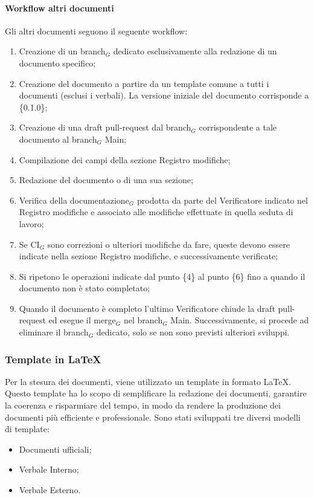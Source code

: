 \documentclass[10pt]{article}
\begin{document}
\begin{justify}
        \paragraph{Workflow altri documenti}
        Gli altri documenti seguono il seguente workflow:
        \begin{enumerate}
            \item Creazione di un branch$_G$ dedicato esclusivamente alla redazione di un documento specifico;
            \item Creazione del documento a partire da un template comune a tutti i documenti (esclusi i verbali). La versione iniziale del documento corrisponde a \{0.1.0\};
            \item Creazione di una draft pull-request dal branch$_G$ corrispondente a tale documento al branch$_G$ Main;
            \item Compilazione dei campi della sezione Registro modifiche;
            \item Redazione del documento o di una sua sezione;
            \item Verifica della documentazione$_G$ prodotta da parte del Verificatore indicato nel Registro modifiche e associato alle modifiche effettuate in quella seduta di lavoro;
            \item Se CI$_G$ sono correzioni o ulteriori modifiche da fare, queste devono essere indicate nella sezione Registro modifiche, e successivamente verificate;
            \item Si ripetono le operazioni indicate dal punto \{4\} al punto \{6\} fino a quando il documento non è stato completato;
            \item Quando il documento è completo l'ultimo Verificatore
            chiude la draft pull-request ed esegue il merge$_G$ nel branch$_G$ Main. Successivamente, si procede ad eliminare il branch$_G$ dedicato, solo se non sono previsti ulteriori sviluppi.
        \end{enumerate}

    \subsubsection{Template in \LaTeX}
    Per la stesura dei documenti, viene utilizzato un template in formato \LaTeX. Questo template ha lo scopo di semplificare la redazione dei documenti, garantire la coerenza e risparmiare del tempo, in modo da rendere la produzione dei documenti più efficiente e professionale. Sono stati sviluppati tre diversi modelli di template:
    \begin{itemize}
        \item Documenti ufficiali;
        \item Verbale Interno;
        \item Verbale Esterno.
    \end{itemize}


\end{justify}
\end{document}

